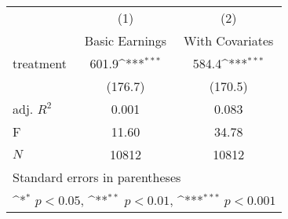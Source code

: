 {
\def\sym#1{\ifmmode^{#1}\else\(^{#1}\)\fi}
\begin{tabular}{l*{2}{c}}
\hline\hline
            &\multicolumn{1}{c}{(1)}&\multicolumn{1}{c}{(2)}\\
            &\multicolumn{1}{c}{Basic Earnings}&\multicolumn{1}{c}{With Covariates}\\
\hline
treatment   &       601.9\sym{***}&       584.4\sym{***}\\
            &     (176.7)         &     (170.5)         \\
\hline
adj. \(R^{2}\)&       0.001         &       0.083         \\
F           &       11.60         &       34.78         \\
\(N\)       &       10812         &       10812         \\
\hline\hline
\multicolumn{3}{l}{\footnotesize Standard errors in parentheses}\\
\multicolumn{3}{l}{\footnotesize \sym{*} \(p<0.05\), \sym{**} \(p<0.01\), \sym{***} \(p<0.001\)}\\
\end{tabular}
}
